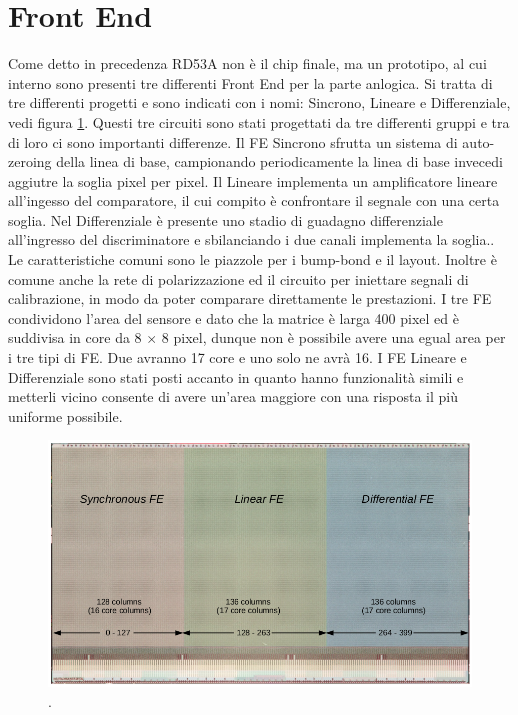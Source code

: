 
\section{Front End}
Come detto in precedenza RD53A non è il chip finale, ma un prototipo, al cui interno sono presenti tre differenti Front End per la parte anlogica. Si tratta di tre differenti progetti e sono indicati con i nomi: Sincrono, Lineare e Differenziale, vedi figura \ref{FrontEnd}. 
Questi tre circuiti sono stati progettati da tre differenti gruppi e tra di loro ci sono importanti differenze. Il FE Sincrono sfrutta un sistema di auto-zeroing della linea di base, campionando periodicamente la linea di base invecedi aggiutre la soglia pixel per pixel. 
Il Lineare implementa un amplificatore lineare all'ingesso del comparatore, il cui compito è confrontare il segnale con una certa soglia. 
Nel Differenziale è presente uno stadio di guadagno differenziale  all'ingresso del discriminatore e sbilanciando i due canali implementa la soglia..
Le caratteristiche comuni sono le piazzole per i bump-bond e il layout. Inoltre è comune anche la rete di polarizzazione ed il circuito per iniettare segnali di calibrazione, in modo da poter comparare direttamente le prestazioni. 
I tre FE condividono l'area del sensore e dato che la matrice è larga 400 pixel ed è suddivisa in core da 8 $\times$ 8 pixel, dunque non è possibile avere una egual area per i tre tipi di FE. Due avranno 17 core e uno solo ne avrà 16. I FE Lineare e Differenziale sono stati posti accanto in quanto hanno funzionalità simili e metterli vicino consente di avere un'area maggiore con una risposta il più uniforme possibile. 
\begin{figure}
\centering
\includegraphics[scale=.3]{Immagini/FrontEnd}
\caption{.}
\label{FrontEnd}
\end{figure}

